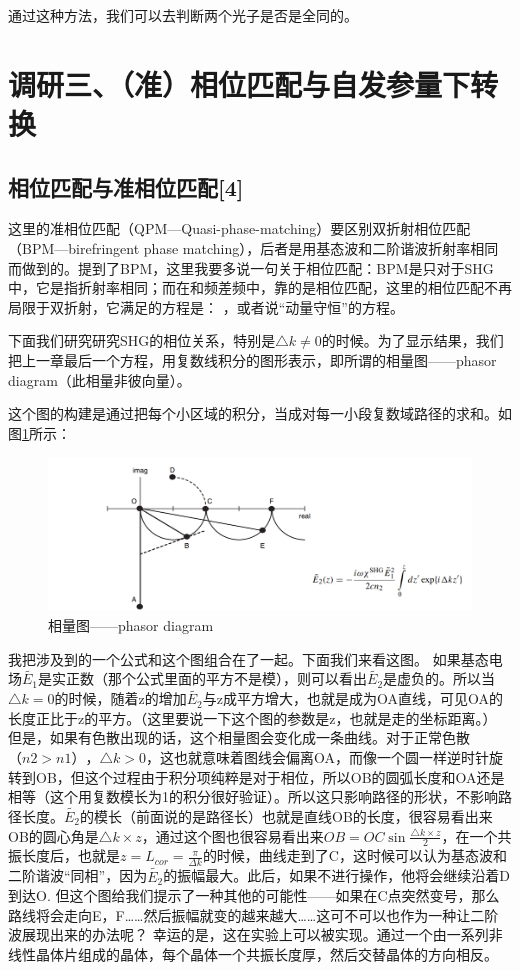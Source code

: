 通过这种方法，我们可以去判断两个光子是否是全同的。


\section{调研三、（准）相位匹配与自发参量下转换}
\subsection{相位匹配与准相位匹配[4]}
这里的准相位匹配（QPM—Quasi-phase-matching）要区别双折射相位匹配（BPM—birefringent phase matching），后者是用基态波和二阶谐波折射率相同而做到的。提到了BPM，这里我要多说一句关于相位匹配：BPM是只对于SHG中，它是指折射率相同；而在和频差频中，靠的是相位匹配，这里的相位匹配不再局限于双折射，它满足的方程是：        ，或者说“动量守恒”的方程。

下面我们研究研究SHG的相位关系，特别是$△k≠0$的时候。为了显示结果，我们把上一章最后一个方程，用复数线积分的图形表示，即所谓的相量图——phasor diagram（此相量非彼向量）。

这个图的构建是通过把每个小区域的积分，当成对每一小段复数域路径的求和。如图\ref{fig:QFM1}所示：

\begin{figure}[ht]
	\centering
	\includegraphics[scale=0.2]{pic/QFM1}
	\caption{相量图——phasor diagram}
	\label{fig:QFM1}
\end{figure}

我把涉及到的一个公式和这个图组合在了一起。下面我们来看这图。
如果基态电场$\widetilde{E_1}$是实正数（那个公式里面的平方不是模），则可以看出$\widetilde{E_2}$是虚负的。所以当$△k=0$的时候，随着z的增加$\widetilde{E_2}$与z成平方增大，也就是成为OA直线，可见OA的长度正比于z的平方。（这里要说一下这个图的参数是z，也就是走的坐标距离。）
但是，如果有色散出现的话，这个相量图会变化成一条曲线。对于正常色散$（n2>n1）$，$△k>0$，这也就意味着图线会偏离OA，而像一个圆一样逆时针旋转到OB，但这个过程由于积分项纯粹是对于相位，所以OB的圆弧长度和OA还是相等（这个用复数模长为1的积分很好验证）。所以这只影响路径的形状，不影响路径长度。$\widetilde{E_2}$的模长（前面说的是路径长）也就是直线OB的长度，很容易看出来OB的圆心角是$△k\times z$，通过这个图也很容易看出来$OB=OC\sin{\frac{\triangle k\times z}{2}}$，在一个共振长度后，也就是$z=L_{cor}=\frac{\pi}{\Delta k}$的时候，曲线走到了C，这时候可以认为基态波和二阶谐波“同相”，因为$\widetilde{E_2}$的振幅最大。此后，如果不进行操作，他将会继续沿着D到达O. 
但这个图给我们提示了一种其他的可能性——如果在C点突然变号，那么路线将会走向E，F……然后振幅就变的越来越大……这可不可以也作为一种让二阶波展现出来的办法呢？
幸运的是，这在实验上可以被实现。通过一个由一系列非线性晶体片组成的晶体，每个晶体一个共振长度厚，然后交替晶体的方向相反。

